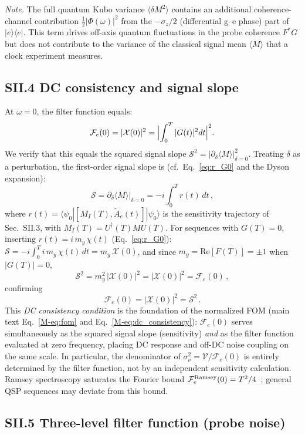 \documentclass[aps,pra,twocolumn,superscriptaddress,longbibliography]{revtex4-2}
\newcommand{\be}{\begin{equation}}
\newcommand{\ee}{\end{equation}}
\begin{document}
\textit{Note.} The full quantum Kubo variance $\langle\delta M^2\rangle$ contains an
additional coherence-channel contribution $\tfrac{1}{2}|\Phi(\omega)|^2$ from
the $-\sigma_z/2$ (differential g--e phase) part of $|e\rangle\langle e|$.
This term drives off-axis quantum fluctuations in the probe coherence $F^*G$
but does not contribute to the variance of the classical signal mean $\langle M\rangle$
that a clock experiment measures.

\subsection*{SII.4 DC consistency and signal slope}

At $\omega=0$, the filter function equals:
\be
  \mathcal{F}_e(0) = |\mathcal{X}(0)|^2 = \Bigl|\int_0^T|G(t)|^2 dt\Bigr|^2.
\ee
We verify that this equals the squared signal slope
$\mathcal{S}^2 = |\partial_\delta\langle M\rangle|^2_{\delta=0}$.
Treating $\delta$ as a perturbation, the first-order signal slope is
(cf.\ Eq.~\eqref{eq:r_G0} and the Dyson expansion):
\be
  \mathcal{S} = \partial_\delta\langle M\rangle\big|_{\delta=0}
  = -i\int_0^T r(t)\,dt\,,
\ee
where $r(t) = \langle\psi_0|[M_I(T),\tilde{A}_e(t)]|\psi_0\rangle$ is the
sensitivity trajectory of Sec.~SII.3, with $M_I(T)=U^\dagger(T)MU(T)$.
For sequences with $G(T)=0$, inserting $r(t)=i\,m_y\,\chi(t)$ (Eq.~\eqref{eq:r_G0}):
$\mathcal{S} = -i\int_0^T i\,m_y\,\chi(t)\,dt = m_y\,\mathcal{X}(0)$,
and since $m_y = \mathrm{Re}[F(T)] = \pm 1$ when $|G(T)|=0$,
\be
  \mathcal{S}^2 = m_y^2\,|\mathcal{X}(0)|^2 = |\mathcal{X}(0)|^2 = \mathcal{F}_e(0)\,,
\ee
confirming
\be
  \mathcal{F}_e(0) = |\mathcal{X}(0)|^2 = \mathcal{S}^2\,.
  \label{eq:dc_consistency_supp}
\ee
This \emph{DC consistency condition} is the foundation of the normalized FOM
(main text Eq.~\eqref{M-eq:fom} and Eq.~\eqref{M-eq:dc_consistency}):
$\mathcal{F}_e(0)$ serves simultaneously as the squared signal slope (sensitivity)
\emph{and} as the filter function evaluated at zero frequency, placing DC response
and off-DC noise coupling on the same scale.
In particular, the denominator of $\sigma^2_\nu = \mathcal{V}/\mathcal{F}_e(0)$
is entirely determined by the filter function, not by an independent sensitivity calculation.
Ramsey spectroscopy saturates the Fourier bound $\mathcal{F}_e^{\rm Ramsey}(0) = T^2/4$~\cite{};
general QSP sequences may deviate from this bound.

\subsection*{SII.5 Three-level filter function (probe noise)}
\end{document}
